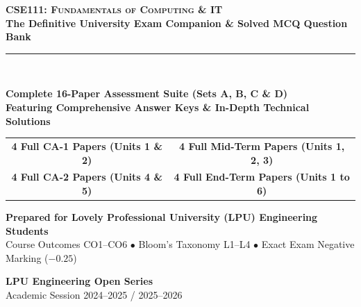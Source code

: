 \begin{titlepage}
\pagecolor{CSNavy}
\color{white}
\vspace*{1.5cm}

\begin{center}
    {\Huge \bfseries \scshape CSE111: Fundamentals of Computing \& IT}\\[5mm]
    {\LARGE \bfseries The Definitive University Exam Companion \& Solved MCQ Question Bank}\\[8mm]
    {\color{LPUOrange}\rule{0.8\textwidth}{2pt}}\\[10mm]

    \begin{tcolorbox}[enhanced, width=0.88\textwidth, colback=white, colframe=LPUOrange, boxrule=1.5pt, arc=3mm, halign=center]
        \color{DarkSlate}
        \vspace{2mm}
        {\Large\bfseries Complete 16-Paper Assessment Suite (Sets A, B, C \& D)}\\[3mm]
        {\large\bfseries Featuring Comprehensive Answer Keys \& In-Depth Technical Solutions}\\[3mm]
        \begin{tabular}{cc}
            \color{CSNavy}\textbf{4 Full CA-1 Papers (Units 1 \& 2)} & \quad \color{CSNavy}\textbf{4 Full Mid-Term Papers (Units 1, 2, 3)} \\
            \color{CSNavy}\textbf{4 Full CA-2 Papers (Units 4 \& 5)} & \quad \color{CSNavy}\textbf{4 Full End-Term Papers (Units 1 to 6)} \\
        \end{tabular}
        \vspace{2mm}
    \end{tcolorbox}

    \vfill

    {\large \bfseries Prepared for Lovely Professional University (LPU) Engineering Students}\\[2mm]
    {\small Course Outcomes CO1--CO6 $\bullet$ Bloom's Taxonomy L1--L4 $\bullet$ Exact Exam Negative Marking ($-0.25$)}\\[10mm]

    \begin{tcolorbox}[width=0.6\textwidth, colback=CSNavy!80!black, colframe=white, boxrule=0.5pt, halign=center]
        \color{white}
        \textbf{LPU Engineering Open Series}\\[1mm]
        {\footnotesize Academic Session 2024--2025 / 2025--2026}
    \end{tcolorbox}
    \vspace*{1cm}
\end{center}
\end{titlepage}
\nopagecolor
\newpage
